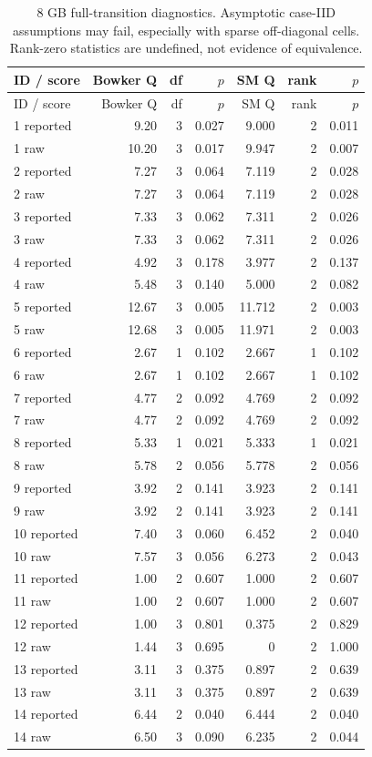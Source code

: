 \begin{longtable}{lrrrrrr}
\caption{8 GB full-transition diagnostics. Asymptotic case-IID assumptions may fail, especially with sparse off-diagonal cells. Rank-zero statistics are undefined, not evidence of equivalence.}\\
ID / score & Bowker Q & df & $p$ & SM Q & rank & $p$\\\toprule\endfirsthead
ID / score & Bowker Q & df & $p$ & SM Q & rank & $p$\\\toprule\endhead
1 reported & 9.20 & 3 & 0.027 & 9.000 & 2 & 0.011\\
1 raw & 10.20 & 3 & 0.017 & 9.947 & 2 & 0.007\\
2 reported & 7.27 & 3 & 0.064 & 7.119 & 2 & 0.028\\
2 raw & 7.27 & 3 & 0.064 & 7.119 & 2 & 0.028\\
3 reported & 7.33 & 3 & 0.062 & 7.311 & 2 & 0.026\\
3 raw & 7.33 & 3 & 0.062 & 7.311 & 2 & 0.026\\
4 reported & 4.92 & 3 & 0.178 & 3.977 & 2 & 0.137\\
4 raw & 5.48 & 3 & 0.140 & 5.000 & 2 & 0.082\\
5 reported & 12.67 & 3 & 0.005 & 11.712 & 2 & 0.003\\
5 raw & 12.68 & 3 & 0.005 & 11.971 & 2 & 0.003\\
6 reported & 2.67 & 1 & 0.102 & 2.667 & 1 & 0.102\\
6 raw & 2.67 & 1 & 0.102 & 2.667 & 1 & 0.102\\
7 reported & 4.77 & 2 & 0.092 & 4.769 & 2 & 0.092\\
7 raw & 4.77 & 2 & 0.092 & 4.769 & 2 & 0.092\\
8 reported & 5.33 & 1 & 0.021 & 5.333 & 1 & 0.021\\
8 raw & 5.78 & 2 & 0.056 & 5.778 & 2 & 0.056\\
9 reported & 3.92 & 2 & 0.141 & 3.923 & 2 & 0.141\\
9 raw & 3.92 & 2 & 0.141 & 3.923 & 2 & 0.141\\
10 reported & 7.40 & 3 & 0.060 & 6.452 & 2 & 0.040\\
10 raw & 7.57 & 3 & 0.056 & 6.273 & 2 & 0.043\\
11 reported & 1.00 & 2 & 0.607 & 1.000 & 2 & 0.607\\
11 raw & 1.00 & 2 & 0.607 & 1.000 & 2 & 0.607\\
12 reported & 1.00 & 3 & 0.801 & 0.375 & 2 & 0.829\\
12 raw & 1.44 & 3 & 0.695 & 0 & 2 & 1.000\\
13 reported & 3.11 & 3 & 0.375 & 0.897 & 2 & 0.639\\
13 raw & 3.11 & 3 & 0.375 & 0.897 & 2 & 0.639\\
14 reported & 6.44 & 2 & 0.040 & 6.444 & 2 & 0.040\\
14 raw & 6.50 & 3 & 0.090 & 6.235 & 2 & 0.044\\
\bottomrule\end{longtable}